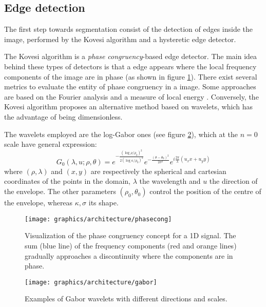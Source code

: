     \subsection{Edge detection}\label{subsection:contour_detection}
        \par{
            The first step towards segmentation consist of the detection of edges inside the image, performed by the Kovesi algorithm and a hysteretic edge detector.
        }
        \par{
            The Kovesi algorithm \cite{mit:kovesiphase, googlescholar:kovesiphase} is a  \emph{phase congruency}-based edge detector. The main idea behind these types of detectors is that a edge appears where the local frequency components of the image are in phase (as shown in figure \ref{fig:phase-congruency}). There exist several metrics to evaluate the entity of phase congruency in a image. Some approaches are based on the Fourier analysis and a measure of local energy \cite{researchgate:phase}. Conversely, the Kovesi algorithm proposes an alternative method based on wavelets, which has the advantage of being dimensionless.
        }
    	\par{
    		The wavelets employed are the log-Gabor ones (see figure \ref{fig:gabor}), which at the $n=0$ scale have general expression:
    		\begin{equation*}
	    		G_0(\lambda, u; \rho, \theta) = e^{-\frac{(\log\rho/\rho_0)^2}{2(\log\kappa/\rho_0)^2}} e^{-\frac{(\theta-\theta_0)^2}{2\sigma^2}} e^{i\frac{2\pi}{\lambda} (u_x x + u_y y)}
    		\end{equation*}
    		where $(\rho,\lambda)$ and $(x,y)$ are respectively the spherical and cartesian coordinates of the points in the domain, $\lambda$ the wavelength and $u$ the direction of the envelope. The other parameters $(\rho_0, \theta_0)$ control the position of the centre of the envelope, whereas $\kappa, \sigma$ its shape.
	    }
    	\begin{figure}
    		\centering
    		\texttt{[image: graphics/architecture/phasecong]}
    		\caption{Visualization of the phase congruency concept for a 1D signal. The sum (blue line) of the frequency components (red and orange lines) gradually approaches a discontinuity where the components are in phase.}
    		\label{fig:phase-congruency}
    	\end{figure}
    	\begin{figure}
    		\centering
    		\texttt{[image: graphics/architecture/gabor]}
    		\caption{Examples of Gabor wavelets with different directions and scales.}
    		\label{fig:gabor}
    	\end{figure}
